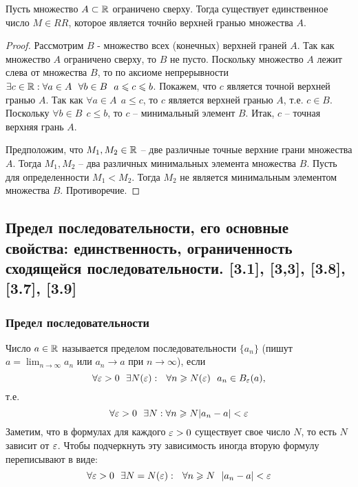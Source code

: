 \documentclass[12pt, a4paper]{article}
\begin{document}
    Пусть множество $A \subset \mathbb{R}$ ограничено сверху. Тогда существует единственное число $M \in RR$, которое является точнйо верхней гранью множества $A$.
    \begin{proof}
    Рассмотрим $B$ - множество всех (конечных) верхней граней $A$. Так как множество $A$ ограничено сверху, то $B$ не пусто. Поскольку множество $A$ лежит слева от множества $B$, то по аксиоме непрерывности $\exists c \in \mathbb{R} : \forall a \in A \ \ \forall b \in B \ \ a \leqslant c \leqslant b$. Покажем, что $c$ является точной верхней гранью $A$. Так как $\forall a \in A \ \ a \leq c$, то $c$ является верхней гранью $A$, т.е. $c \in B$. Поскольку $\forall b \in B \ \ c \leq b$, то $c$ -- минимальный элемент $B$. Итак, $c$ -- точная верхняя грань $A$.

    Предположим, что $M_1, M_2 \in \mathbb{R}$ -- две различные точные верхние грани множества $A$. Тогда $M_1, M_2$ -- два различных минимальных элемента множества $B$. Пусть для определенности $M_1 < M_2$. Тогда $M_2$ не является минимальным элементом множества $B$. Противоречие.
    \end{proof}
    \subsection{Предел последовательности, его основные свойства: единственность, ограниченность сходящейся последовательности. [3.1], [3,3], [3.8], [3.7], [3.9]}
    \subsubsection{Предел последовательности}
    Число $a \in \mathbb{R}$ называется пределом последовательности $\{a_n\}$ (пишут $a =  \lim_{n \to \infty} a_n$ или $a_n \to a$ при $n \to \infty$), если
    \begin{equation*}
        \forall \varepsilon > 0 \ \ \exists N(\varepsilon) : \ \ \forall n \geqslant N(\varepsilon) \ \ a_n \in B_{\varepsilon}(a), 
    \end{equation*}
    т.е.
    \begin{equation*}
        \forall \varepsilon > 0 \ \ \exists N: \forall n \geqslant N |a_n - a| < \varepsilon
    \end{equation*}
    Заметим, что в формулах для каждого $\varepsilon > 0$ существует свое число $N$, то есть $N$ зависит от $\varepsilon$. Чтобы подчеркнуть эту зависимость иногда вторую формулу переписывают в виде: 
    \begin{equation*}
        \forall \eps > 0 \ \ \exists N = N(\eps): \ \ \forall n \geq N \ \ |a_n - a| < \eps
    \end{equation*}
\end{document}
